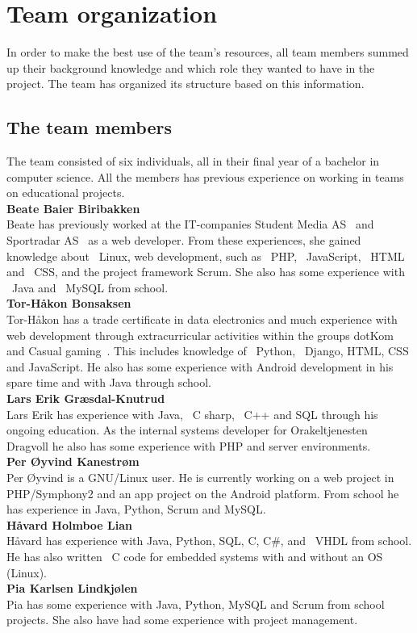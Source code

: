\newpage
\section{Team organization}
In order to make the best use of the team's resources, all team members summed up their background knowledge and which role they wanted to have in the project. The team has organized its structure based on this information.

\subsection{The team members}
The team consisted of six individuals, all in their final year of a bachelor in computer science. All the members has previous experience on working in teams on educational projects.\\

\noindent\textbf{Beate Baier Biribakken}\\
Beate has previously worked at the IT-companies Student Media AS~\cite{studentmedia} and Sportradar AS~\cite{sportradar} as a web developer. From these experiences, she gained knowledge about ~\gls{Linux}, web development, such as ~\gls{PHP}, ~\gls{JavaScript}, ~\gls{HTML} and ~\gls{CSS}, and the project framework Scrum. She also has some experience with ~\gls{Java} and ~\gls{MySQL} from school.\\

\noindent\textbf{Tor-Håkon Bonsaksen}\\
Tor-Håkon has a trade certificate in data electronics and much experience with web development through extracurricular activities within the groups dotKom~\cite{dotKom} and Casual gaming~\cite{casualgaming}. This includes knowledge of ~\gls{Python}, ~\gls{Django}, HTML, CSS and JavaScript. He also has some experience with Android development in his spare time and with Java through school.\\

\noindent\textbf{Lars Erik Græsdal-Knutrud}\\
Lars Erik has experience with Java, ~\gls{C sharp}, ~\gls{C++} and SQL through his ongoing education. As the internal systems developer for Orakeltjenesten Dragvoll he also has some experience with PHP and server environments. \\

\noindent\textbf{Per Øyvind Kanestrøm}\\
Per Øyvind is a GNU/Linux user. He is currently working on a web project in PHP/Symphony2 and an app project on the Android platform. From school he has experience in Java, Python, Scrum and MySQL.\\

\noindent\textbf{Håvard Holmboe Lian}\\
Håvard has experience with Java, Python, SQL, C, C\#, and ~\gls{VHDL} from school. He has also written ~\gls{C} code for embedded systems with and without an OS (Linux).\\ 

\noindent\textbf{Pia	Karlsen	Lindkjølen}\\
Pia has some experience with Java, Python, MySQL and Scrum from school projects. She also have had some experience with project management. 